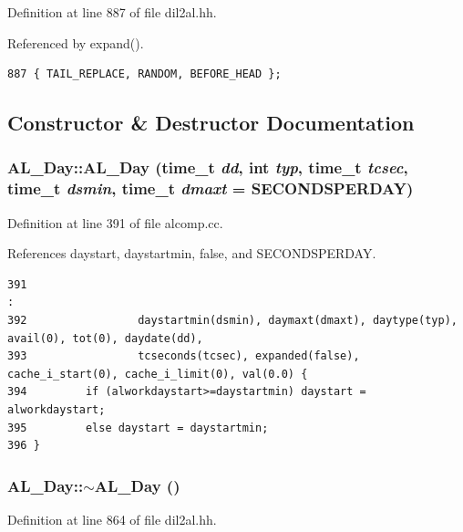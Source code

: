 Definition at line 887 of file dil2al.hh.

Referenced by expand().



\footnotesize\begin{verbatim}887 { TAIL_REPLACE, RANDOM, BEFORE_HEAD };
\end{verbatim}\normalsize 


\subsection{Constructor \& Destructor Documentation}
\subsubsection{\setlength{\rightskip}{0pt plus 5cm}AL\_\-Day::AL\_\-Day (time\_\-t {\em dd}, int {\em typ}, time\_\-t {\em tcsec}, time\_\-t {\em dsmin}, time\_\-t {\em dmaxt} = SECONDSPERDAY)}\label{classAL__Day_a0}




Definition at line 391 of file alcomp.cc.

References daystart, daystartmin, false, and SECONDSPERDAY.



\footnotesize\begin{verbatim}391                                                                                           :
392                 daystartmin(dsmin), daymaxt(dmaxt), daytype(typ), avail(0), tot(0), daydate(dd),
393                 tcseconds(tcsec), expanded(false), cache_i_start(0), cache_i_limit(0), val(0.0) {
394         if (alworkdaystart>=daystartmin) daystart = alworkdaystart;
395         else daystart = daystartmin;
396 }

\end{verbatim}\normalsize 
{}
\subsubsection{\setlength{\rightskip}{0pt plus 5cm}AL\_\-Day::$\sim$AL\_\-Day ()\hspace{0.3cm}{\tt  [inline]}}\label{classAL__Day_a1}




Definition at line 864 of file dil2al.hh.



